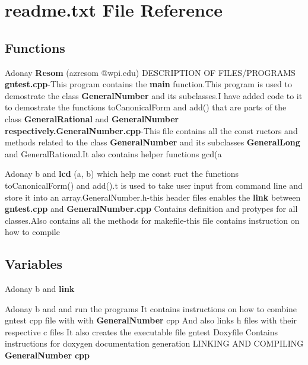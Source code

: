 \section{readme.\+txt File Reference}
\label{readme_8txt}
\subsection*{Functions}
\begin{DoxyCompactItemize}
\item 
Adonay {\bf Resom} (azresom @wpi.\+edu) D\+E\+S\+C\+R\+I\+P\+T\+I\+ON OF F\+I\+L\+ES/P\+R\+O\+G\+R\+A\+MS {\bf gntest.\+cpp}-\/This program contains the {\bf main} function.\+This program is used to demostrate the class {\bf General\+Number} and its subclasses.\+I have added code to it to demostrate the functions to\+Canonical\+Form and add() that are parts of the class {\bf General\+Rational} and {\bf General\+Number} {\bf respectively.\+General\+Number.\+cpp}-\/This file contains all the const ructors and methods related to the class {\bf General\+Number} and its subclasses {\bf General\+Long} and General\+Rational.\+It also contains helper functions gcd(a
\item 
Adonay b and {\bf lcd} (a, b) which help me const ruct the functions to\+Canonical\+Form() and add().t is used to take user input from command line and store it into an array.\+General\+Number.\+h-\/this header files enables the {\bf link} between {\bf gntest.\+cpp} and {\bf General\+Number.\+cpp} Contains definition and protypes for all classes.\+Also contains all the methods for makefile-\/this file contains instruction on how to compile
\end{DoxyCompactItemize}
\subsection*{Variables}
\begin{DoxyCompactItemize}
\item 
Adonay b and {\bf link}
\item 
Adonay b and and run the programs It contains instructions on how to combine gntest cpp file with with {\bf General\+Number} cpp And also links h files with their respective c files It also creates the executable file gntest Doxyfile Contains instructions for doxygen documentation generation L\+I\+N\+K\+I\+NG A\+ND C\+O\+M\+P\+I\+L\+I\+NG {\bf General\+Number} {\bf cpp}
\end{DoxyCompactItemize}


